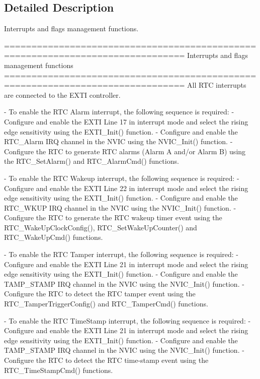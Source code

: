 \subsection{Detailed Description}
Interrupts and flags management functions. \begin{DoxyVerb} ===============================================================================
                       Interrupts and flags management functions
 ===============================================================================  
 All RTC interrupts are connected to the EXTI controller.
 
 - To enable the RTC Alarm interrupt, the following sequence is required:
   - Configure and enable the EXTI Line 17 in interrupt mode and select the rising 
     edge sensitivity using the EXTI_Init() function.
   - Configure and enable the RTC_Alarm IRQ channel in the NVIC using the NVIC_Init()
     function.
   - Configure the RTC to generate RTC alarms (Alarm A and/or Alarm B) using
     the RTC_SetAlarm() and RTC_AlarmCmd() functions.

 - To enable the RTC Wakeup interrupt, the following sequence is required:
   - Configure and enable the EXTI Line 22 in interrupt mode and select the rising 
     edge sensitivity using the EXTI_Init() function.
   - Configure and enable the RTC_WKUP IRQ channel in the NVIC using the NVIC_Init()
     function.
   - Configure the RTC to generate the RTC wakeup timer event using the 
     RTC_WakeUpClockConfig(), RTC_SetWakeUpCounter() and RTC_WakeUpCmd() functions.

 - To enable the RTC Tamper interrupt, the following sequence is required:
   - Configure and enable the EXTI Line 21 in interrupt mode and select the rising 
     edge sensitivity using the EXTI_Init() function.
   - Configure and enable the TAMP_STAMP IRQ channel in the NVIC using the NVIC_Init()
     function.
   - Configure the RTC to detect the RTC tamper event using the 
     RTC_TamperTriggerConfig() and RTC_TamperCmd() functions.

 - To enable the RTC TimeStamp interrupt, the following sequence is required:
   - Configure and enable the EXTI Line 21 in interrupt mode and select the rising 
     edge sensitivity using the EXTI_Init() function.
   - Configure and enable the TAMP_STAMP IRQ channel in the NVIC using the NVIC_Init()
     function.
   - Configure the RTC to detect the RTC time-stamp event using the 
     RTC_TimeStampCmd() functions.\end{DoxyVerb}
 


